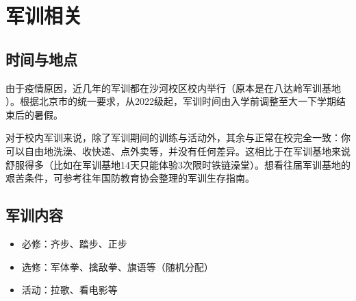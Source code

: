 \section{军训相关}

\subsection{时间与地点}

由于疫情原因，近几年的军训都在沙河校区校内举行（原本是在八达岭军训基地 ）。根据北京市的统一要求，从2022级起，军训时间由入学前调整至大一下学期结束后的暑假。

对于校内军训来说，除了军训期间的训练与活动外，其余与正常在校完全一致：你可以自由地洗澡、收快递、点外卖等，并没有任何差异。这相比于在军训基地来说舒服得多（比如在军训基地14天只能体验3次限时铁链澡堂）。想看往届军训基地的艰苦条件，可参考往年国防教育协会整理的军训生存指南。

\subsection{军训内容}

\begin{itemize}
    \item 必修：齐步、踏步、正步
    \item 选修：军体拳、擒敌拳、旗语等（随机分配）
    \item 活动：拉歌、看电影等
\end{itemize}
